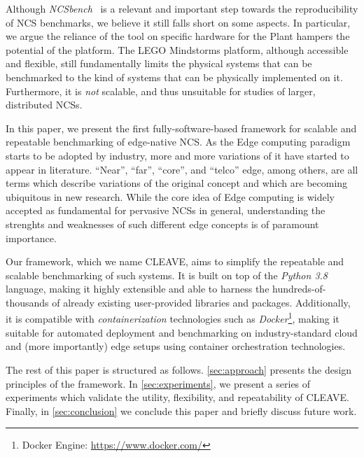 Although \emph{NCSbench}~\cite{Zoppi2020NCSBench} is a relevant and important step towards the reproducibility of \ac{NCS} benchmarks, we believe it still falls short on some aspects.
In particular, we argue the reliance of the tool on specific hardware for the Plant hampers the potential of the platform.
The LEGO Mindstorms platform, although accessible and flexible, still fundamentally limits the physical systems that can be benchmarked to the kind of systems that can be physically implemented on it.
Furthermore, it is \emph{not} scalable, and thus unsuitable for studies of larger, distributed \acp{NCS}.

In this paper, we present the first fully-software-based framework for scalable and repeatable benchmarking of edge-native \ac{NCS}.
As the Edge computing paradigm starts to be adopted by industry, more and more variations of it have started to appear in literature.
``Near'', ``far'', ``core'', and ``telco'' edge, among others, are all terms which describe variations of the original concept and which are becoming ubiquitous in new research.
While the core idea of Edge computing is widely accepted as fundamental for pervasive \acp{NCS} in general, understanding the strenghts and weaknesses of such different edge concepts is of paramount importance.

Our framework, which we name \ac{CLEAVE}, aims to simplify the repeatable and scalable benchmarking of such systems. 
It is built on top of the \emph{Python 3.8} language, making it highly extensible and able to harness the hundreds-of-thousands of already existing user-provided libraries and packages.
Additionally, it is compatible with \emph{containerization} technologies such as \emph{Docker}\footnote{Docker Engine: \url{https://www.docker.com/}}, making it suitable for automated deployment and benchmarking on industry-standard cloud and (more importantly) edge setups using container orchestration technologies.

The rest of this paper is structured as follows.
\cref{sec:approach} presents the design principles of the framework.
In \cref{sec:experiments}, we present a series of experiments which validate the utility, flexibility, and repeatability of \ac{CLEAVE}.
Finally, in \cref{sec:conclusion} we conclude this paper and briefly discuss future work.
